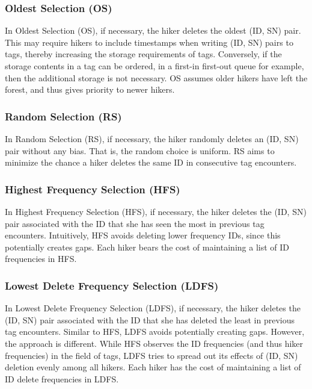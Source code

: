 \subsubsection{\textbf{Oldest Selection (OS)}}
In Oldest Selection (OS), if necessary, the hiker deletes the oldest (ID, SN) pair.  This may require hikers to include timestamps when writing (ID, SN) pairs to tags, thereby increasing the storage requirements of tags.  Conversely, if the storage contents in a tag can be ordered, in a first-in first-out queue for example, then the additional storage is not necessary.  OS assumes older hikers have left the forest, and thus gives priority to newer hikers.  

\subsubsection{\textbf{Random Selection (RS)}}
In Random Selection (RS), if necessary, the hiker randomly deletes an (ID, SN) pair without any bias.  That is, the random choice is uniform.  RS aims to minimize the chance a hiker deletes the same ID in consecutive tag encounters. 

\subsubsection{\textbf{Highest Frequency Selection (HFS)}}
In Highest Frequency Selection (HFS), if necessary, the hiker deletes the (ID, SN) pair associated with the ID that she has seen the most in previous tag encounters.  Intuitively, HFS avoids deleting lower frequency IDs, since this potentially creates gaps.  Each hiker bears the cost of maintaining a list of ID frequencies in HFS.

\subsubsection{\textbf{Lowest Delete Frequency Selection (LDFS)}}
In Lowest Delete Frequency Selection (LDFS), if necessary, the hiker deletes the (ID, SN) pair associated with the ID that she has deleted the least in previous tag encounters.  Similar to HFS, LDFS avoids potentially creating gaps.  However, the approach is different.  While HFS observes the ID frequencies (and thus hiker frequencies) in the field of tags, LDFS tries to spread out its effects of (ID, SN) deletion evenly among all hikers.  Each hiker has the cost of maintaining a list of ID delete frequencies in LDFS.

